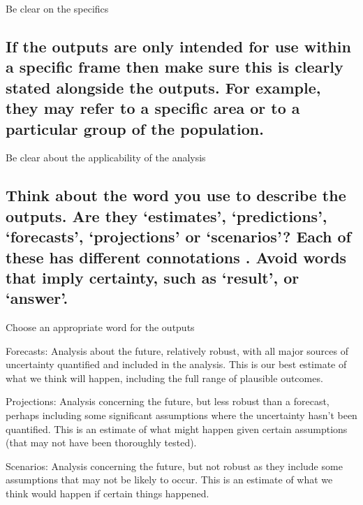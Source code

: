 \documentclass[]{book}
\begin{document}
 Be clear on the specifics

\subsection{If the outputs are only intended for use within a specific
frame then make sure this is clearly stated alongside the outputs. For
example, they may refer to a specific area or to a particular group of
the
population.}\label{if-the-outputs-are-only-intended-for-use-within-a-specific-frame-then-make-sure-this-is-clearly-stated-alongside-the-outputs.-for-example-they-may-refer-to-a-specific-area-or-to-a-particular-group-of-the-population.}

 Be clear about the applicability of the analysis

\subsection{\texorpdfstring{Think about the word you use to describe the
outputs. Are they `estimates', `predictions', `forecasts', `projections'
or `scenarios'? Each of these has different connotations . Avoid words
that imply certainty, such as `result', or
`answer'.}{Think about the word you use to describe the outputs. Are they estimates, predictions, forecasts, projections or scenarios? Each of these has different connotations . Avoid words that imply certainty, such as result, or answer.}}\label{think-about-the-word-you-use-to-describe-the-outputs.-are-they-estimates-predictions-forecasts-projections-or-scenarios-each-of-these-has-different-connotations-.-avoid-words-that-imply-certainty-such-as-result-or-answer.}

 Choose an appropriate word for the outputs

Forecasts: Analysis about the future, relatively robust, with all major
sources of uncertainty quantified and included in the analysis. This is
our best estimate of what we think will happen, including the full range
of plausible outcomes.

Projections: Analysis concerning the future, but less robust than a
forecast, perhaps including some significant assumptions where the
uncertainty hasn't been quantified. This is an estimate of what might
happen given certain assumptions (that may not have been thoroughly
tested).

Scenarios: Analysis concerning the future, but not robust as they
include some assumptions that may not be likely to occur. This is an
estimate of what we think would happen if certain things happened.
\end{document}
